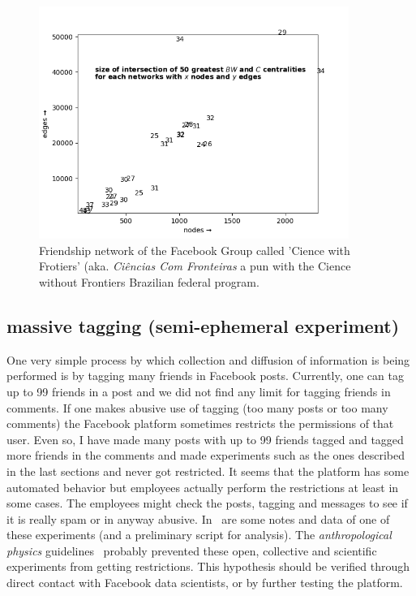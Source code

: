 \documentclass[a4paper]{article}
\begin{document}
\begin{figure}\label{nh}
  \centering
    \includegraphics[width=0.9\textwidth]{netHip}
  \caption{Friendship network of the Facebook Group called 'Cience with Frotiers' (aka. \emph{Ciências Com Fronteiras} a pun with the Cience without Frontiers Brazilian federal program.}
\end{figure}

\subsection{massive tagging (semi-ephemeral experiment)}
One very simple process by which collection and diffusion of information is being performed
is by tagging many friends in Facebook posts.
Currently, one can tag up to 99 friends in a post
and we did not find any limit for tagging friends in comments.
If one makes abusive use of tagging (too many posts or too many comments)
the Facebook platform sometimes restricts the permissions of that user.
Even so, I have made many posts with up to 99 friends tagged and tagged more
friends in the comments and made experiments such as the ones described in the
last sections and never got restricted.
It seems that the platform has some automated behavior but employees actually
perform the restrictions at least in some cases.
The employees might check the posts, tagging and messages to see if it is
really spam or in anyway abusive.
In~\cite{anExp} are some notes and data of one of these experiments (and a preliminary script for analysis).
The \emph{anthropological physics} guidelines~\cite{anPhy,anPhy2} probably prevented
these open, collective and scientific experiments from getting restrictions.
This hypothesis should be verified through direct contact with Facebook data scientists,
or by further testing the platform.
\end{document}
